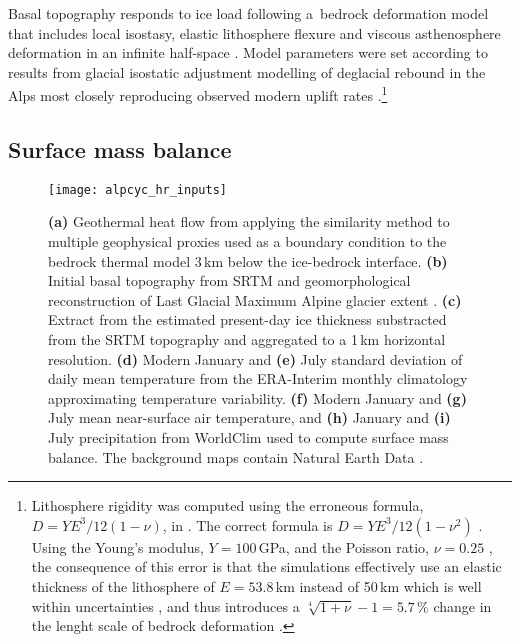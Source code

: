 \documentclass[tc, manuscript]{copernicus}
\begin{document}
    Basal topography responds to ice load following a~bedrock deformation model
    that includes local isostasy, elastic lithosphere flexure and viscous
    asthenosphere deformation in an infinite half-space
    \citep{Lingle.Clark.1985, Bueler.etal.2007}. Model parameters were set
    according to
    results from glacial isostatic adjustment modelling of deglacial rebound in
    the Alps most closely reproducing observed modern uplift rates
    \citep[Supplementary Fig.~7]{Mey.etal.2016}.\footnote{Lithosphere rigidity
        was computed using the erroneous formula, ${D=YE^3/12(1-\nu)}$, in
        \citet{Mey.etal.2016}. The correct formula is ${D=YE^3/12(1-\nu^2)}$
        \citep[p.~443]{Love.1906}.  Using the Young's modulus, $Y=100$\,GPa,
        and the Poisson ratio, $\nu=0.25$ \citep{Mey.etal.2016}, the
        consequence of this error is that the simulations effectively use an
        elastic thickness of the lithosphere of $E=53.8$\,km instead of 50\,km
        which is well within uncertainties \citep{Mey.etal.2016}, and thus
        introduces a ${\sqrt[4]{1+\nu}-1=5.7\,\%}$ change in the lenght scale
        of bedrock deformation \citep{Walcott.1970}.}


\subsection{Surface mass balance}
\label{sec:surface}

    \begin{figure*}[t]
      \centerline{\texttt{[image: alpcyc\_hr\_inputs]}}
      \caption{%
        \textbf{(a)} Geothermal heat flow from applying the similarity method
        to multiple geophysical proxies \citep{Goutorbe.etal.2011} used as a
        boundary condition to the bedrock thermal model 3\,km below the
        ice-bedrock interface.
        \textbf{(b)} Initial basal topography from SRTM
        \citep{Jarvis.etal.2008} and geomorphological reconstruction of Last
        Glacial Maximum Alpine glacier extent \citep[solid red
        line,][]{Ehlers.etal.2011}.
        \textbf{(c)} Extract from the estimated present-day ice thickness
        \citep{Huss.Farinotti.2012} substracted from the SRTM topography and
        aggregated to a 1\,km horizontal resolution.
        \textbf{(d)} Modern January and \textbf{(e)} July standard deviation
        \citep{Seguinot.2013} of daily mean temperature from the ERA-Interim
        \citep[1979--2012;][]{Dee.etal.2011} monthly climatology approximating
        temperature variability.
        \textbf{(f)} Modern January and \textbf{(g)} July mean near-surface air
        temperature, and \textbf{(h)} January and \textbf{(i)} July
        precipitation from WorldClim \citep[1960--1990;][]{Hijmans.etal.2005}
        used to compute surface mass balance. The background maps contain
        Natural Earth Data \citep{Patterson.Kelso.2017}.}
      \label{fig:inputs}
    \end{figure*}
\end{document}

